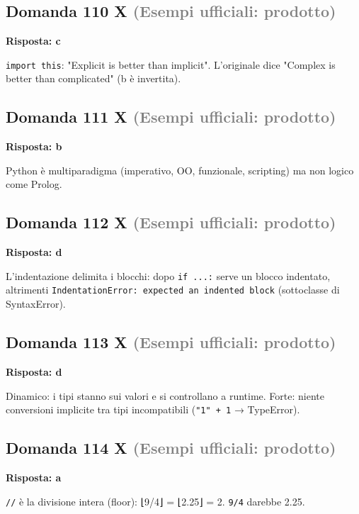 \documentclass[a4paper,11pt]{article}
\begin{document}
\subsection*{Domanda 110 X \hfill {\small \textcolor{gray}{(Esempi ufficiali: prodotto)}}}
\textbf{Risposta: c}\par
\texttt{import this}: "Explicit is better than implicit". L'originale dice "Complex is better than complicated" (b è invertita).



\subsection*{Domanda 111 X \hfill {\small \textcolor{gray}{(Esempi ufficiali: prodotto)}}}
\textbf{Risposta: b}\par
Python è multiparadigma (imperativo, OO, funzionale, scripting) ma non logico come Prolog.



\subsection*{Domanda 112 X \hfill {\small \textcolor{gray}{(Esempi ufficiali: prodotto)}}}
\textbf{Risposta: d}\par
L'indentazione delimita i blocchi: dopo \texttt{if ...:} serve un blocco indentato, altrimenti \texttt{IndentationError: expected an indented block} (sottoclasse di SyntaxError).



\subsection*{Domanda 113 X \hfill {\small \textcolor{gray}{(Esempi ufficiali: prodotto)}}}
\textbf{Risposta: d}\par
Dinamico: i tipi stanno sui valori e si controllano a runtime. Forte: niente conversioni implicite tra tipi incompatibili (\texttt{"1" + 1} → TypeError).



\subsection*{Domanda 114 X \hfill {\small \textcolor{gray}{(Esempi ufficiali: prodotto)}}}
\textbf{Risposta: a}\par
\texttt{//} è la divisione intera (floor): ⌊9/4⌋ = ⌊2.25⌋ = 2. \texttt{9/4} darebbe 2.25.
\end{document}
